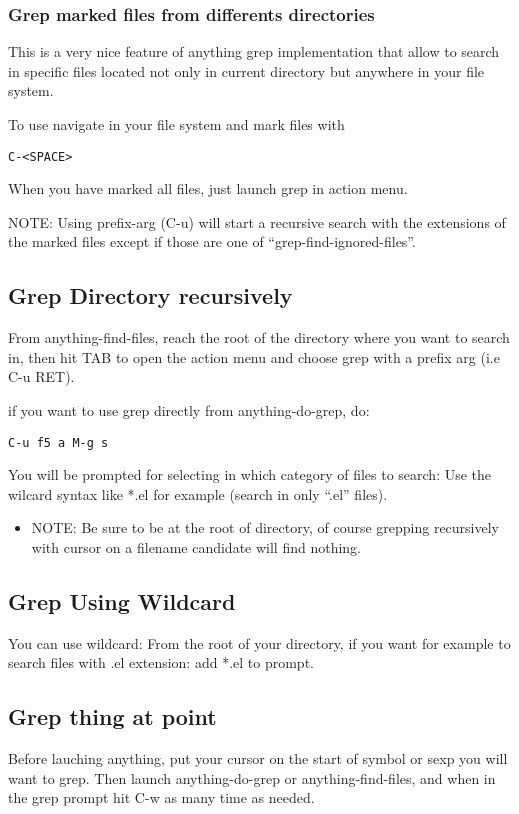 \documentclass[a4paper,11pt]{article}
\begin{document}
\subsubsection{Grep marked files from differents directories}
\label{sec:grep-marked-files-1}
This is a very nice feature of anything grep implementation that allow to search in specific files located not
only in current directory but anywhere in your file system.

To use navigate in your file system and mark files with 
\begin{verbatim}
C-<SPACE> 
\end{verbatim}
When you have marked all files, just launch grep in action menu.

NOTE: Using prefix-arg (C-u) will start a recursive search with the extensions of the marked files
except if those are one of ``grep-find-ignored-files''.  

\subsection{Grep Directory recursively}
\label{sec:grep-direct-recurs}
From anything-find-files, reach the root of the directory where you want to search in,
then hit TAB to open the action menu and choose grep with a prefix arg (i.e C-u RET).

if you want to use grep directly from anything-do-grep, do:

\begin{verbatim}
C-u f5 a M-g s
\end{verbatim}

You will be prompted for selecting in which category of files to search:
Use the wilcard syntax like *.el for example (search in only ``.el'' files).
\\
\begin{itemize}
\item NOTE: Be sure to be at the root of directory, of course grepping recursively with cursor
on a filename candidate will find nothing.

\end{itemize}
\subsection{Grep Using Wildcard}
\label{sec:grep-using-wildcard}
You can use wildcard:
From the root of your directory, if you want for example to search files with .el extension:
add *.el to prompt.

\subsection{Grep thing at point}
\label{sec:grep-thing-at}
Before lauching anything, put your cursor on the start of symbol or sexp you will want to grep.
Then launch anything-do-grep or anything-find-files, and when in the grep prompt hit C-w as many time as needed.
\end{document}
